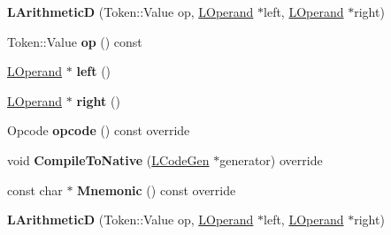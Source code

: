 \begin{DoxyCompactItemize}
\item 
{\bfseries L\+ArithmeticD} (Token\+::\+Value op, \hyperlink{classv8_1_1internal_1_1_l_operand}{L\+Operand} $\ast$left, \hyperlink{classv8_1_1internal_1_1_l_operand}{L\+Operand} $\ast$right)\hypertarget{classv8_1_1internal_1_1_l_arithmetic_d_aad5c45947dcad72abbbcd55b081f4e6e}{}\label{classv8_1_1internal_1_1_l_arithmetic_d_aad5c45947dcad72abbbcd55b081f4e6e}

\item 
Token\+::\+Value {\bfseries op} () const \hypertarget{classv8_1_1internal_1_1_l_arithmetic_d_a0689ba0a4deee0bb4450bb0fdc7f877b}{}\label{classv8_1_1internal_1_1_l_arithmetic_d_a0689ba0a4deee0bb4450bb0fdc7f877b}

\item 
\hyperlink{classv8_1_1internal_1_1_l_operand}{L\+Operand} $\ast$ {\bfseries left} ()\hypertarget{classv8_1_1internal_1_1_l_arithmetic_d_a8d143eb5deb9725b2544b7ecc1a6b7aa}{}\label{classv8_1_1internal_1_1_l_arithmetic_d_a8d143eb5deb9725b2544b7ecc1a6b7aa}

\item 
\hyperlink{classv8_1_1internal_1_1_l_operand}{L\+Operand} $\ast$ {\bfseries right} ()\hypertarget{classv8_1_1internal_1_1_l_arithmetic_d_ad78701fa7af5138fc5a741a1ceed96a7}{}\label{classv8_1_1internal_1_1_l_arithmetic_d_ad78701fa7af5138fc5a741a1ceed96a7}

\item 
Opcode {\bfseries opcode} () const  override\hypertarget{classv8_1_1internal_1_1_l_arithmetic_d_a6371d86c37944a1a90b2e4778d0b7024}{}\label{classv8_1_1internal_1_1_l_arithmetic_d_a6371d86c37944a1a90b2e4778d0b7024}

\item 
void {\bfseries Compile\+To\+Native} (\hyperlink{classv8_1_1internal_1_1_l_code_gen}{L\+Code\+Gen} $\ast$generator) override\hypertarget{classv8_1_1internal_1_1_l_arithmetic_d_a87834ef9f5e37f8ade4c8e8ef4284572}{}\label{classv8_1_1internal_1_1_l_arithmetic_d_a87834ef9f5e37f8ade4c8e8ef4284572}

\item 
const char $\ast$ {\bfseries Mnemonic} () const  override\hypertarget{classv8_1_1internal_1_1_l_arithmetic_d_a401c29ddc6c8aa2dc41d23d4be14aff7}{}\label{classv8_1_1internal_1_1_l_arithmetic_d_a401c29ddc6c8aa2dc41d23d4be14aff7}

\item 
{\bfseries L\+ArithmeticD} (Token\+::\+Value op, \hyperlink{classv8_1_1internal_1_1_l_operand}{L\+Operand} $\ast$left, \hyperlink{classv8_1_1internal_1_1_l_operand}{L\+Operand} $\ast$right)\hypertarget{classv8_1_1internal_1_1_l_arithmetic_d_aad5c45947dcad72abbbcd55b081f4e6e}{}\label{classv8_1_1internal_1_1_l_arithmetic_d_aad5c45947dcad72abbbcd55b081f4e6e}


\end{DoxyCompactItemize}
